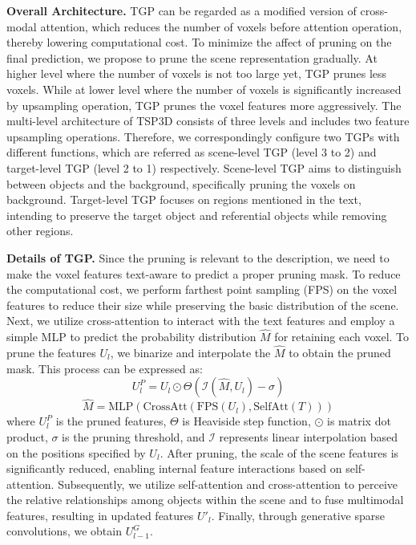 \textbf{Overall Architecture.} TGP can be regarded as a modified version of cross-modal attention, which reduces the number of voxels before attention operation, thereby lowering computational cost. To minimize the affect of pruning on the final prediction, we propose to prune the scene representation gradually. At higher level where the number of voxels is not too large yet, TGP prunes less voxels. While at lower level where the number of voxels is significantly increased by upsampling operation, TGP prunes the voxel features more aggressively.
The multi-level architecture of TSP3D consists of three levels and includes two feature upsampling operations. Therefore, we correspondingly configure two TGPs with different functions, which are referred as scene-level TGP (level 3 to 2) and target-level TGP (level 2 to 1) respectively. Scene-level TGP aims to distinguish between objects and the background, specifically pruning the voxels on background. Target-level TGP focuses on regions mentioned in the text, intending to preserve the target object and referential objects while removing other regions.


\textbf{Details of TGP.} Since the pruning is relevant to the description, we need to make the voxel features text-aware to predict a proper pruning mask.
To reduce the computational cost, we perform farthest point sampling (FPS) on the voxel features to reduce their size while preserving the basic distribution of the scene. Next, we utilize cross-attention to interact with the text features and employ a simple MLP to predict the probability distribution $\hat{M}$ for retaining each voxel. To prune the features $U_l$, we binarize and interpolate the $\hat{M}$ to obtain the pruned mask. This process can be expressed as:
\begin{equation}\label{eq2} 
    U^P_l = U_l \odot \Theta(\mathcal{I}(\hat{M}, U_l) - \sigma)
\end{equation}
\begin{equation}
    \hat{M} = \text{MLP}(\text{CrossAtt}(\text{FPS}(U_l),\text{SelfAtt}(T)))
\end{equation}
where $U^P_l$ is the pruned features, \(\Theta\) is Heaviside step function, \(\odot\) is matrix dot product, $\sigma$ is the pruning threshold, and \(\mathcal{I}\) represents linear interpolation based on the positions specified by $U_l$. After pruning, the scale of the scene features is significantly reduced, enabling internal feature interactions based on self-attention. Subsequently, we utilize self-attention and cross-attention to perceive the relative relationships among objects within the scene and to fuse multimodal features, resulting in updated features $U'_l$. Finally, through generative sparse convolutions, we obtain $U^G_{l-1}$.


